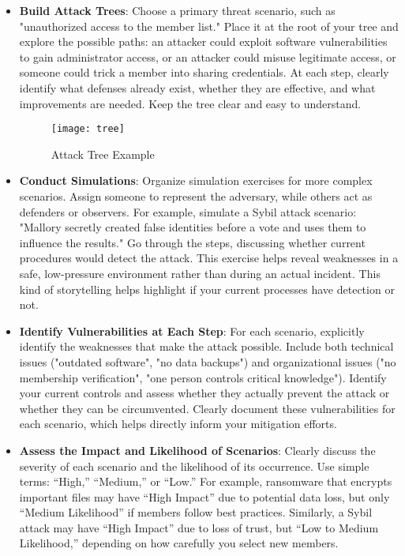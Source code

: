 \begin{itemize}
\item \textbf{Build Attack Trees}: Choose a primary threat scenario, such as
"unauthorized access to the member list." Place it at the root of your tree and
explore the possible paths: an attacker could exploit software vulnerabilities
to gain administrator access, or an attacker could misuse legitimate access, or
someone could trick a member into sharing credentials. At each step, clearly
identify what defenses already exist, whether they are effective, and what
improvements are needed. Keep the tree clear and easy to understand.

\begin{figure}[htbp]
    \centering
    \texttt{[image: tree]}
    \caption{Attack Tree Example}
    \label{fig:attack_tree_example}
  \end{figure}

\item \textbf{Conduct Simulations}: Organize simulation exercises for
more complex scenarios. Assign someone to represent the adversary, while others
act as defenders or observers. For example, simulate a Sybil attack scenario:
"Mallory secretly created false identities before a vote and uses them to
influence the results." Go through the steps, discussing whether current
procedures would detect the attack. This exercise helps reveal weaknesses in a
safe, low-pressure environment rather than during an actual incident.
This kind of storytelling helps highlight if your current processes have detection or not.
\item \textbf{Identify Vulnerabilities at Each Step}: For each scenario,
explicitly identify the weaknesses that make the attack possible. Include both
technical issues ("outdated software", "no data backups") and organizational
issues ("no membership verification", "one person controls critical knowledge").
Identify your current controls and assess whether they actually prevent the
attack or whether they can be circumvented. Clearly document these
vulnerabilities for each scenario, which helps directly inform your mitigation
efforts.

\item \textbf{Assess the Impact and Likelihood of Scenarios}: Clearly discuss
the severity of each scenario and the likelihood of its occurrence. Use simple
terms: “High,” “Medium,” or “Low.” For example, ransomware that encrypts
important files may have “High Impact” due to potential data loss, but only
“Medium Likelihood” if members follow best practices. Similarly, a Sybil attack
may have “High Impact” due to loss of trust, but “Low to Medium Likelihood,”
depending on how carefully you select new members.


\end{itemize}
